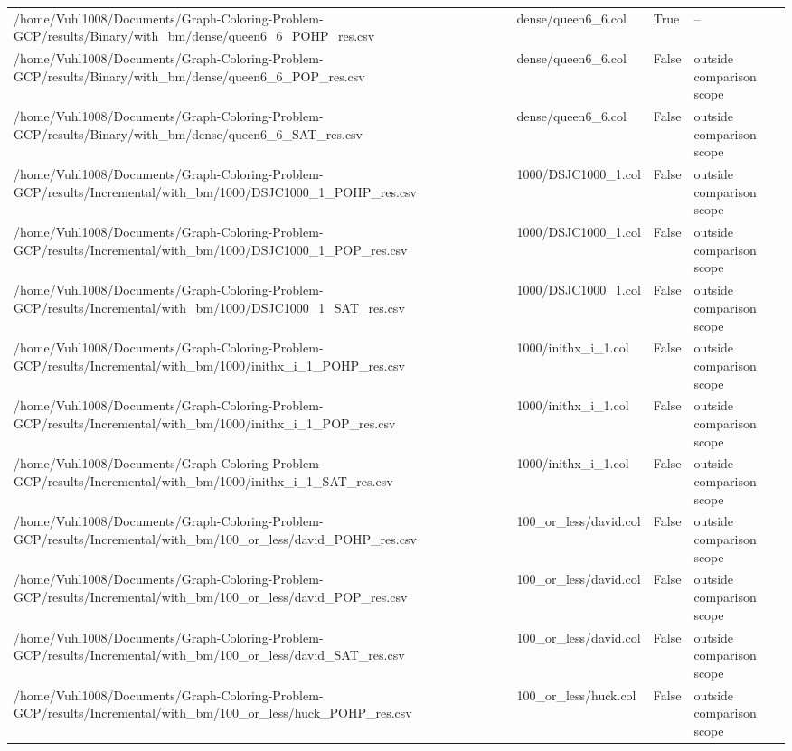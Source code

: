 \begin{table}[htbp]
\begin{tabular}{llll}
/home/Vuhl1008/Documents/Graph-Coloring-Problem-GCP/results/Binary/with\_bm/dense/queen6\_6\_POHP\_res.csv & dense/queen6\_6.col & True & -- \\
/home/Vuhl1008/Documents/Graph-Coloring-Problem-GCP/results/Binary/with\_bm/dense/queen6\_6\_POP\_res.csv & dense/queen6\_6.col & False & outside comparison scope \\
/home/Vuhl1008/Documents/Graph-Coloring-Problem-GCP/results/Binary/with\_bm/dense/queen6\_6\_SAT\_res.csv & dense/queen6\_6.col & False & outside comparison scope \\
/home/Vuhl1008/Documents/Graph-Coloring-Problem-GCP/results/Incremental/with\_bm/1000/DSJC1000\_1\_POHP\_res.csv & 1000/DSJC1000\_1.col & False & outside comparison scope \\
/home/Vuhl1008/Documents/Graph-Coloring-Problem-GCP/results/Incremental/with\_bm/1000/DSJC1000\_1\_POP\_res.csv & 1000/DSJC1000\_1.col & False & outside comparison scope \\
/home/Vuhl1008/Documents/Graph-Coloring-Problem-GCP/results/Incremental/with\_bm/1000/DSJC1000\_1\_SAT\_res.csv & 1000/DSJC1000\_1.col & False & outside comparison scope \\
/home/Vuhl1008/Documents/Graph-Coloring-Problem-GCP/results/Incremental/with\_bm/1000/inithx\_i\_1\_POHP\_res.csv & 1000/inithx\_i\_1.col & False & outside comparison scope \\
/home/Vuhl1008/Documents/Graph-Coloring-Problem-GCP/results/Incremental/with\_bm/1000/inithx\_i\_1\_POP\_res.csv & 1000/inithx\_i\_1.col & False & outside comparison scope \\
/home/Vuhl1008/Documents/Graph-Coloring-Problem-GCP/results/Incremental/with\_bm/1000/inithx\_i\_1\_SAT\_res.csv & 1000/inithx\_i\_1.col & False & outside comparison scope \\
/home/Vuhl1008/Documents/Graph-Coloring-Problem-GCP/results/Incremental/with\_bm/100\_or\_less/david\_POHP\_res.csv & 100\_or\_less/david.col & False & outside comparison scope \\
/home/Vuhl1008/Documents/Graph-Coloring-Problem-GCP/results/Incremental/with\_bm/100\_or\_less/david\_POP\_res.csv & 100\_or\_less/david.col & False & outside comparison scope \\
/home/Vuhl1008/Documents/Graph-Coloring-Problem-GCP/results/Incremental/with\_bm/100\_or\_less/david\_SAT\_res.csv & 100\_or\_less/david.col & False & outside comparison scope \\
/home/Vuhl1008/Documents/Graph-Coloring-Problem-GCP/results/Incremental/with\_bm/100\_or\_less/huck\_POHP\_res.csv & 100\_or\_less/huck.col & False & outside comparison scope \\

\end{tabular}
\end{table}
